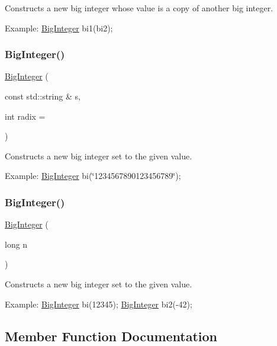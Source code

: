 Constructs a new big integer whose value is a copy of another big integer. 

Example\+: \mbox{\hyperlink{classBigInteger}{Big\+Integer}} bi1(bi2); \mbox{\label{classBigInteger_aa54e846a6f657634a4554b9540b339e4}} 
\subsubsection{\texorpdfstring{Big\+Integer()}{BigInteger()}\hspace{0.1cm}{\footnotesize\ttfamily [3/4]}}
{\footnotesize\ttfamily \mbox{\hyperlink{classBigInteger}{Big\+Integer}} (\begin{DoxyParamCaption}\item[{const std\+::string \&}]{s,  }\item[{int}]{radix = {} }\end{DoxyParamCaption})}



Constructs a new big integer set to the given value. 

Example\+: \mbox{\hyperlink{classBigInteger}{Big\+Integer}} bi(\char`\"{}1234567890123456789\char`\"{}); \mbox{\label{classBigInteger_a647b32454d89f386f4e8d3137d4e5526}} 
\subsubsection{\texorpdfstring{Big\+Integer()}{BigInteger()}\hspace{0.1cm}{\footnotesize\ttfamily [4/4]}}
{\footnotesize\ttfamily \mbox{\hyperlink{classBigInteger}{Big\+Integer}} (\begin{DoxyParamCaption}\item[{long}]{n }\end{DoxyParamCaption})}



Constructs a new big integer set to the given value. 

Example\+: \mbox{\hyperlink{classBigInteger}{Big\+Integer}} bi(12345); \mbox{\hyperlink{classBigInteger}{Big\+Integer}} bi2(-\/42); 

\subsection{Member Function Documentation}
\mbox{\label{classBigInteger_aa60f0a3be5766293b78752ac6d7430fe}} 
